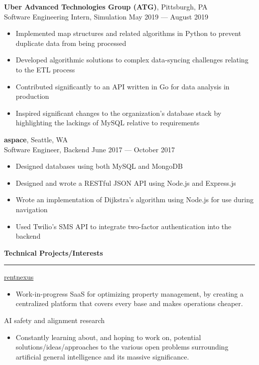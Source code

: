 \documentclass[11pt]{article}
\begin{document}
\begin{flushleft}
		\textbf{Uber Advanced Technologies Group (ATG)}, Pittsburgh, PA\\
		{\small Software Engineering Intern, Simulation \hfill May 2019 --- August 2019}
		\vspace{-1.25mm}
		\begin{itemize}
			\item Implemented map structures and related algorithms in Python to prevent duplicate data from being processed
			\vspace{-1.5mm}
			\item Developed algorithmic solutions to complex data-syncing challenges relating to the ETL process
			\vspace{-1.5mm}
			\item Contributed significantly to an API written in Go for data analysis in production
			\vspace{-1.5mm}
			\item Inspired significant changes to the organization's database stack by highlighting the lackings of MySQL relative to requirements
		\end{itemize}
	
		\textbf{aspace}, Seattle, WA\\
		{\small Software Engineer, Backend \hfill June 2017 --- October 2017}
		\vspace{-1.25mm}
		\begin{itemize}
			\item Designed databases using both MySQL and MongoDB
			\vspace{-1.5mm}
			\item Designed and wrote a RESTful JSON API using Node.js and Express.js
			\vspace{-1.5mm}
			\item Wrote an implementation of Dijkstra's algorithm using Node.js for use during navigation
			\vspace{-1.5mm}
			\item Used Twilio's SMS API to integrate two-factor authentication into the backend
		\end{itemize}
		
		\vspace{1.5mm}
		{\large \raggedright \textbf{Technical Projects/Interests}}
		\vspace{1.25mm}
	
		\hrule
	
		\vspace{2.25mm}
		\href{https://rentnexus.net}{rentnexus}
		\begin{itemize}
			\item Work-in-progress SaaS for optimizing property management, by creating a centralized platform that covers every base and makes operations cheaper.
		\end{itemize}
		AI safety and alignment research
		\begin{itemize}
			\item Constantly learning about, and hoping to work on, potential solutions/ideas/approaches to the various open problems surrounding artificial general intelligence and its massive significance.
		\end{itemize}
		

\end{flushleft}
\end{document}
